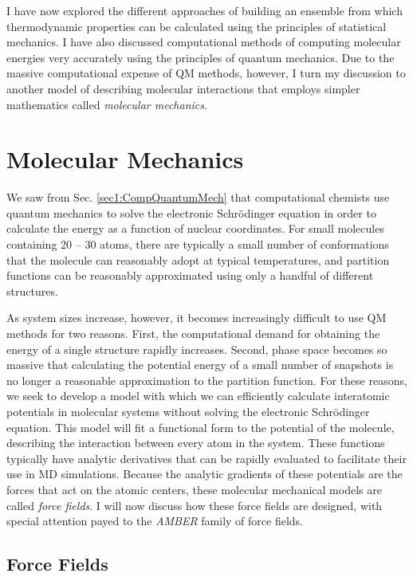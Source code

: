 I have now explored the different approaches of building an ensemble from which
thermodynamic properties can be calculated using the principles of statistical
mechanics. I have also discussed computational methods of computing molecular
energies very accurately using the principles of quantum mechanics. Due to the
massive computational expense of QM methods, however, I turn my discussion to
another model of describing molecular interactions that employs simpler
mathematics called \emph{molecular mechanics}.

\section{Molecular Mechanics}

We saw from Sec. \ref{sec1:CompQuantumMech} that computational chemists use
quantum mechanics to solve the electronic Schr\"odinger equation in order to
calculate the energy as a function of nuclear coordinates. For small molecules
containing 20 -- 30 atoms, there are typically a small number of conformations
that the molecule can reasonably adopt at typical temperatures, and partition
functions can be reasonably approximated using only a handful of different
structures.

As system sizes increase, however, it becomes increasingly difficult to use QM
methods for two reasons. First, the computational demand for obtaining the
energy of a single structure rapidly increases. Second, phase space becomes so
massive that calculating the potential energy of a small number of snapshots is
no longer a reasonable approximation to the partition function. For these
reasons, we seek to develop a model with which we can efficiently calculate
interatomic potentials in molecular systems without solving the electronic
Schr\"odinger equation. This model will fit a functional form to the potential
of the molecule, describing the interaction between every atom in the system.
These functions typically have analytic derivatives that can be rapidly
evaluated to facilitate their use in MD simulations. Because the analytic
gradients of these potentials are the forces that act on the atomic centers,
these molecular mechanical models are called \emph{force fields}. I will now
discuss how these force fields are designed, with special attention payed to the
\emph{AMBER} family of force fields.

\subsection{Force Fields}

